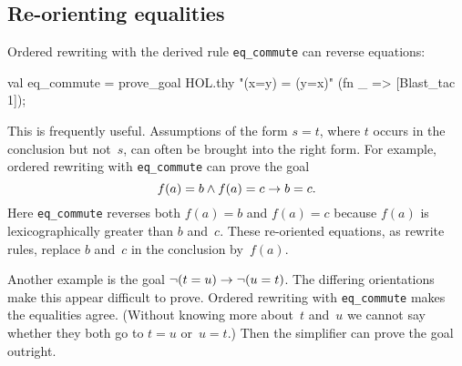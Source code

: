 \subsection{Re-orienting equalities}
Ordered rewriting with the derived rule \texttt{eq_commute} can reverse
equations:
\begin{ttbox}
val eq_commute = prove_goal HOL.thy "(x=y) = (y=x)"
                 (fn _ => [Blast_tac 1]);
\end{ttbox}
This is frequently useful.  Assumptions of the form $s=t$, where $t$ occurs
in the conclusion but not~$s$, can often be brought into the right form.
For example, ordered rewriting with \texttt{eq_commute} can prove the goal
\[ f(a)=b \wedge f(a)=c \rightarrow b=c. \]
Here \texttt{eq_commute} reverses both $f(a)=b$ and $f(a)=c$
because $f(a)$ is lexicographically greater than $b$ and~$c$.  These
re-oriented equations, as rewrite rules, replace $b$ and~$c$ in the
conclusion by~$f(a)$. 

Another example is the goal $\neg(t=u) \rightarrow \neg(u=t)$.
The differing orientations make this appear difficult to prove.  Ordered
rewriting with \texttt{eq_commute} makes the equalities agree.  (Without
knowing more about~$t$ and~$u$ we cannot say whether they both go to $t=u$
or~$u=t$.)  Then the simplifier can prove the goal outright.


